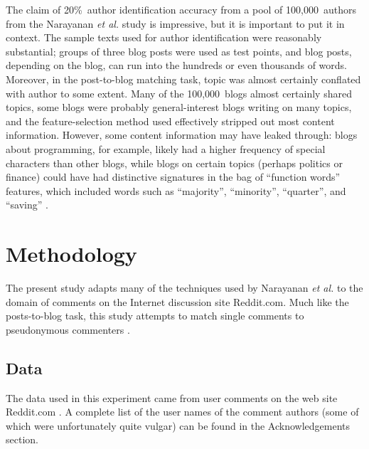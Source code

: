 \documentclass{article}
\begin{document}
The claim of 20\%~author identification accuracy from a pool of 100,000~authors from the Narayanan \textit{et al.} study is impressive, but it is important to put it in context. The sample texts used for author identification were reasonably substantial; groups of three blog posts were used as test points, and blog posts, depending on the blog, can run into the hundreds or even thousands of words. Moreover, in the post-to-blog matching task, topic was almost certainly conflated with author to some extent. Many of the 100,000~blogs almost certainly shared topics, some blogs were probably general-interest blogs writing on many topics, and the feature-selection method used effectively stripped out most content information. However, some content information may have leaked through: blogs about programming, for example, likely had a higher frequency of special characters than other blogs, while blogs on certain topics (perhaps politics or finance) could have had distinctive signatures in the bag of ``function words'' features, which included words such as ``majority'', ``minority'', ``quarter'', and ``saving'' \cite{narayanan2012feasibility}.

\section{Methodology}

The present study adapts many of the techniques used by Narayanan \textit{et al.} to the domain of comments on the Internet discussion site Reddit.com. Much like the posts-to-blog task, this study attempts to match single comments to pseudonymous commenters \cite{narayanan2012feasibility}.

\subsection{Data}
The data used in this experiment came from user comments on the web site Reddit.com \cite{reddit2012reddit}. A complete list of the user names of the comment authors (some of which were unfortunately quite vulgar) can be found in the Acknowledgements section.
\end{document}
